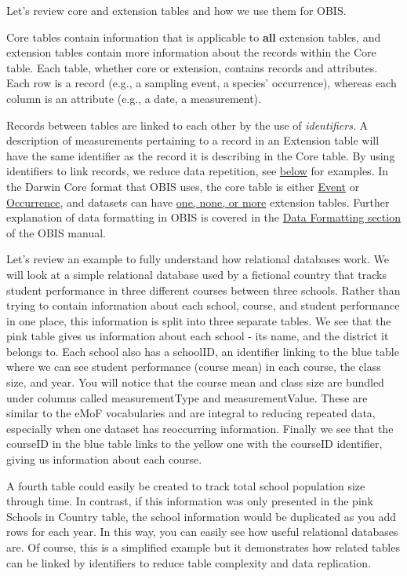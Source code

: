 \documentclass[
  letterpaper,
  DIV=11,
  numbers=noendperiod,
  oneside]{scrreprt}
\begin{document}
Let's review core and extension tables and how we use them for OBIS.

Core tables contain information that is applicable to \textbf{all}
extension tables, and extension tables contain more information about
the records within the Core table. Each table, whether core or
extension, contains records and attributes. Each row is a record (e.g.,
a sampling event, a species' occurrence), whereas each column is an
attribute (e.g., a date, a measurement).

Records between tables are linked to each other by the use of
\emph{identifiers}. A description of measurements pertaining to a record
in an Extension table will have the same identifier as the record it is
describing in the Core table. By using identifiers to link records, we
reduce data repetition, see
\protect\hyperlink{how-to-avoid-redundancy}{below} for examples. In the
Darwin Core format that OBIS uses, the core table is either
\href{https://manual.obis.org/data_format.html\#when-to-use-event-core}{Event}
or
\href{https://manual.obis.org/data_format.html\#when-to-use-occurrence-core}{Occurrence},
and datasets can have
\protect\hyperlink{extensions-accepted-by-OBIS}{one, none, or more}
extension tables. Further explanation of data formatting in OBIS is
covered in the \href{formatting.html}{Data Formatting section} of the
OBIS manual.

Let's review an example to fully understand how relational databases
work. We will look at a simple relational database used by a fictional
country that tracks student performance in three different courses
between three schools. Rather than trying to contain information about
each school, course, and student performance in one place, this
information is split into three separate tables. We see that the pink
table gives us information about each school - its name, and the
district it belongs to. Each school also has a schoolID, an identifier
linking to the blue table where we can see student performance (course
mean) in each course, the class size, and year. You will notice that the
course mean and class size are bundled under columns called
measurementType and measurementValue. These are similar to the eMoF
vocabularies and are integral to reducing repeated data, especially when
one dataset has reoccurring information. Finally we see that the
courseID in the blue table links to the yellow one with the courseID
identifier, giving us information about each course.

A fourth table could easily be created to track total school population
size through time. In contrast, if this information was only presented
in the pink Schools in Country table, the school information would be
duplicated as you add rows for each year. In this way, you can easily
see how useful relational databases are. Of course, this is a simplified
example but it demonstrates how related tables can be linked by
identifiers to reduce table complexity and data replication.
\end{document}
